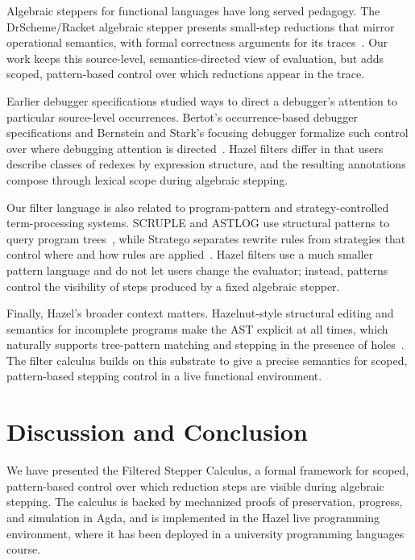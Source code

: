 \documentclass[acmsmall,anonymous]{acmart}
\begin{document}
Algebraic steppers for functional languages have long served pedagogy. The
DrScheme/Racket algebraic stepper presents small-step reductions that mirror
operational semantics, with formal correctness arguments for its
traces~\cite{clements2001stepper}. Our work keeps this source-level,
semantics-directed view of evaluation, but adds scoped, pattern-based control
over which reductions appear in the trace.

Earlier debugger specifications studied ways to direct a debugger's attention
to particular source-level occurrences. Bertot's occurrence-based debugger
specifications and Bernstein and Stark's focusing debugger formalize such
control over where debugging attention is directed~\cite{bertot1991occurrences,
bernstein1995focusing}. Hazel filters differ in that users describe classes of
redexes by expression structure, and the resulting annotations compose through
lexical scope during algebraic stepping.

Our filter language is also related to program-pattern and strategy-controlled
term-processing systems. SCRUPLE and ASTLOG use structural patterns to query
program trees~\cite{paul1994scruple,crew1997astlog}, while Stratego separates
rewrite rules from strategies that control where and how rules are
applied~\cite{visser2001stratego}. Hazel filters use a much smaller pattern
language and do not let users change the evaluator; instead, patterns control
the visibility of steps produced by a fixed algebraic stepper.

Finally, Hazel’s broader context matters. Hazelnut-style structural editing
and semantics for incomplete programs make the AST explicit at all times,
which naturally supports tree-pattern matching and stepping in the presence
of holes~\cite{omar2017hazelnut,voysey2018running}. The filter calculus builds
on this substrate to give a precise semantics for scoped, pattern-based
stepping control in a live functional environment.

\section{Discussion and Conclusion}

We have presented the Filtered Stepper Calculus, a formal framework
for scoped, pattern-based control over which reduction steps are
visible during algebraic stepping. The calculus is backed by
mechanized proofs of preservation, progress, and simulation in Agda,
and is implemented in the Hazel live programming environment, where it
has been deployed in a university programming languages course.
\end{document}
